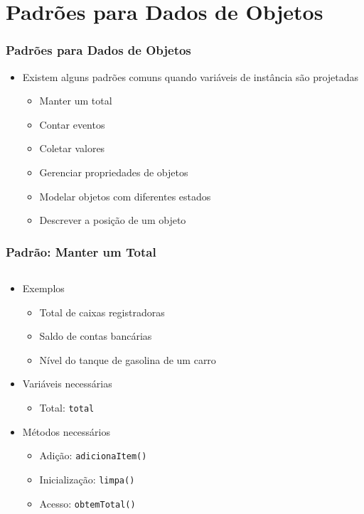 \documentclass[xcolor={dvipsnames,table},aspectratio=169]{beamer}
\begin{document}
\section{Padrões para Dados de Objetos}

\begin{frame}\frametitle{Padrões para Dados de Objetos}
\begin{itemize}
	\item Existem alguns padrões comuns quando variáveis de instância são projetadas
	\begin{itemize}
		\item Manter um total
		\item Contar eventos
		\item Coletar valores
		\item Gerenciar propriedades de objetos
		\item Modelar objetos com diferentes estados
		\item Descrever a posição de um objeto
	\end{itemize}
\end{itemize}
\end{frame}

\begin{frame}[fragile]\frametitle{Padrão: Manter um Total}
\begin{columns}[T]
	\begin{column}{0.5\linewidth}
\begin{itemize}
	\item Exemplos
	\begin{itemize}
		\item Total de caixas registradoras
		\item Saldo de contas bancárias
		\item Nível do tanque de gasolina de um carro
	\end{itemize}
	\item Variáveis necessárias
	\begin{itemize}
		\item Total: \texttt{total}
	\end{itemize}
	\item Métodos necessários
	\begin{itemize}
		\item Adição: \texttt{adicionaItem()}
		\item Inicialização: \texttt{limpa()}
		\item Acesso: \texttt{obtemTotal()}
	\end{itemize}
\end{itemize}
	\end{column}
	\begin{column}{0.5\linewidth}
{\scriptsize\inputminted[bgcolor=cyan!10]{java}{src/caixa0/CaixaRegistradora.java}}
	\end{column}
\end{columns}
\end{frame}
\end{document}
